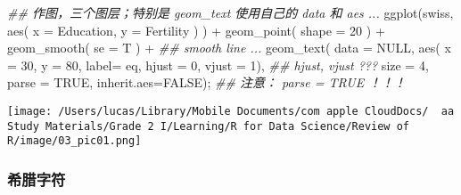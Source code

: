 \documentclass[
]{article}
\let\oldincludegraphics\includegraphics
\renewcommand{\includegraphics}[2][]{\begin{center}\oldincludegraphics[#1]{#2}\end{center}}
\newenvironment{Shaded}{}{}
\newcommand{\AttributeTok}[1]{\textcolor[rgb]{0.49,0.56,0.16}{#1}}
\newcommand{\ConstantTok}[1]{\textcolor[rgb]{0.53,0.00,0.00}{#1}}
\newcommand{\DecValTok}[1]{\textcolor[rgb]{0.25,0.63,0.44}{#1}}
\newcommand{\DocumentationTok}[1]{\textcolor[rgb]{0.73,0.13,0.13}{\textit{#1}}}
\newcommand{\FunctionTok}[1]{\textcolor[rgb]{0.02,0.16,0.49}{#1}}
\newcommand{\NormalTok}[1]{#1}
\newcommand{\SpecialCharTok}[1]{\textcolor[rgb]{0.25,0.44,0.63}{#1}}
\begin{document}
\begin{Shaded}
\begin{Highlighting}[]
\DocumentationTok{\#\# 作图，三个图层；特别是 geom\_text 使用自己的 data 和 aes ... }
\FunctionTok{ggplot}\NormalTok{(swiss, }\FunctionTok{aes}\NormalTok{( }\AttributeTok{x =}\NormalTok{ Education,  }\AttributeTok{y =}\NormalTok{ Fertility ) ) }\SpecialCharTok{+}
        \FunctionTok{geom\_point}\NormalTok{( }\AttributeTok{shape =} \DecValTok{20}\NormalTok{ ) }\SpecialCharTok{+}
        \FunctionTok{geom\_smooth}\NormalTok{( }\AttributeTok{se =}\NormalTok{ T ) }\SpecialCharTok{+} \DocumentationTok{\#\# smooth line ... }
        \FunctionTok{geom\_text}\NormalTok{( }\AttributeTok{data =} \ConstantTok{NULL}\NormalTok{,}
                   \FunctionTok{aes}\NormalTok{( }\AttributeTok{x =} \DecValTok{30}\NormalTok{, }\AttributeTok{y =} \DecValTok{80}\NormalTok{, }\AttributeTok{label=}\NormalTok{ eq, }\AttributeTok{hjust =} \DecValTok{0}\NormalTok{, }\AttributeTok{vjust =} \DecValTok{1}\NormalTok{), }\DocumentationTok{\#\# hjust, vjust ???}
                   \AttributeTok{size =} \DecValTok{4}\NormalTok{, }\AttributeTok{parse =} \ConstantTok{TRUE}\NormalTok{, }\AttributeTok{inherit.aes=}\ConstantTok{FALSE}\NormalTok{); }\DocumentationTok{\#\# 注意： parse = TRUE ！！！}
\end{Highlighting}
\end{Shaded}

\texttt{[image: /Users/lucas/Library/Mobile Documents/com~apple~CloudDocs/~~aa Study Materials/Grade 2 I/Learning/R for Data Science/Review of R/image/03\_pic01.png]}

\hypertarget{ux5e0cux814aux5b57ux7b26}{%
\subsubsection{希腊字符}\label{ux5e0cux814aux5b57ux7b26}}
\end{document}
